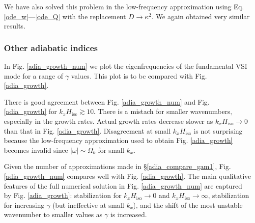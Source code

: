 We have also solved this problem in the low-frequency approximation
using Eq. \ref{ode_w}---\ref{ode_Q} with the replacement
$D\to\kappa^2$. We again obtained very similar results. 


\subsubsection{Other adiabatic indices}
In Fig. \ref{adia_growth_num} we plot the eigenfrequencies of the
fundamental VSI mode for a range of $\gamma$ values. This plot is to
be compared with Fig. \ref{adia_growth}. 

There is good agreement between Fig. \ref{adia_growth_num} and
Fig. \ref{adia_growth} for $k_xH_\mathrm{iso}\gtrsim10$. There is a
mistach for smaller wavenumbers, especially in the growth
rates. Actual growth rates decrease slower as $k_xH_\mathrm{iso}\to0$
than that in Fig. \ref{adia_growth}. Disagreement at small
$k_xH_\mathrm{iso}$ is not surprising because the low-frequency
approximation used to obtain Fig. \ref{adia_growth} becomes invalid since
$|\omega|\sim\Omega_k$ for small $k_x$. 

Given the number of approximations made in \S\ref{adia_compare_gam1},
Fig. \ref{adia_growth_num} compares well with
Fig. \ref{adia_growth}. The main qualitative features of the full
numerical solution in Fig. \ref{adia_growth_num} are captured by
Fig. \ref{adia_growth}: stabilization for
$k_xH_\mathrm{iso}\to0$ and $k_xH_\mathrm{iso}\to\infty$,
stabilization for increasing $\gamma$ (but ineffective at small $k_x$), 
and the shift of the most unstable wavenumber to smaller values as
$\gamma$ is increased. 


